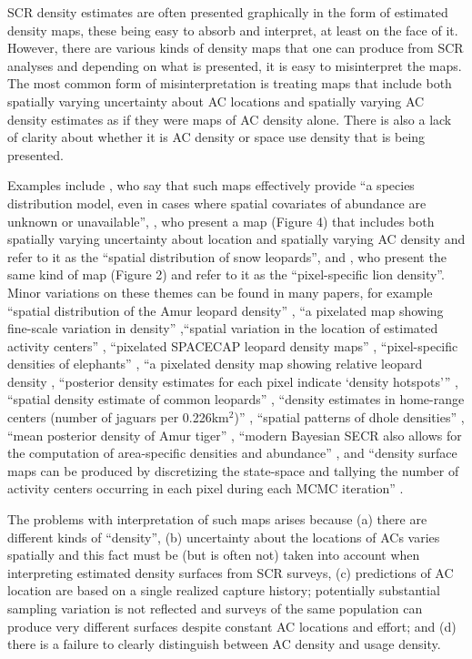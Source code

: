 \documentclass[useAMS,usenatbib,referee]{biom}
\begin{document}
SCR density estimates are often presented graphically in the form of estimated density maps, these being easy to absorb and interpret, at least on the face of it.  However, there are various kinds of density maps that one can produce from SCR analyses and depending on what is presented, it is easy to misinterpret the maps. The most common form of misinterpretation is treating maps that include both spatially varying uncertainty about AC locations and spatially varying AC density estimates as if they were maps of AC density alone. There is also a lack of clarity about whether it is AC density or space use density that is being presented.

Examples include \cite{Dorazio+Karanth:17}, who say that such maps effectively provide  ``a species distribution model, even in cases where spatial covariates of abundance are unknown or unavailable'', \cite{Alexander+al:15}, who present a map (Figure 4) that includes both spatially varying uncertainty about location and spatially varying AC density and refer to it as the ``spatial distribution of snow leopards'', and \cite{Elliot+Gopalaswamy:16}, who present the same kind of map (Figure 2) and refer to it as the ``pixel-specific lion density''. Minor variations on these themes can be found in many papers, for example ``spatial distribution of the Amur leopard density'' \citep{Qi2015}, ``a pixelated map showing fine-scale variation in density'' \citep{Fouche2020},``spatial variation in the location of estimated activity centers'' \citep{Blanc2013}, ``pixelated SPACECAP leopard density maps'' \citep{Devens2021}, ``pixel-specific densities of elephants'' \citep{Goswami2019}, ``a pixelated density map showing relative leopard density \citep{Kandel2020}, ``posterior density estimates for each pixel indicate `density hotspots''' \citep{samarasinghe2022evidence}, ``spatial density estimate of common leopards'' \citep{Goldberg2015}, ``density estimates in home-range centers (number of jaguars per 0.226km$^2$)'' \citep{Lavariega2020}, ``spatial patterns of dhole densities'' \citep{Srivathsa2021}, ``mean posterior density of Amur tiger'' \citep{Xiao2016}, ``modern Bayesian SECR also allows for the computation of area-specific densities and abundance'' \citep{braczkowski2022spatially}, and ``density surface maps can be produced by discretizing the state-space and tallying the number of activity centers occurring in each pixel during each MCMC iteration'' \citep{Chandler+Royle:13}.

The problems with interpretation of such maps arises because (a) there are different kinds of ``density'', (b) uncertainty about the locations of ACs varies spatially and this fact must be (but is often not) taken into account when interpreting estimated density surfaces from SCR surveys, (c) predictions of AC location are based on a single realized capture history; potentially substantial sampling variation is not reflected and surveys of the same population can produce very different surfaces despite constant AC locations and effort; and (d) there is a failure to clearly distinguish between AC density and usage density.
\end{document}
